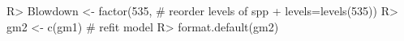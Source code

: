 \documentclass[
]{article}
\begin{document}
\begin{Schunk}
\begin{Sinput}
R> Blowdown <- factor(535,  # reorder levels of spp
+                            levels=levels(535))
R> gm2 <- c(gm1)   # refit model
R> format.default(gm2)
\end{Sinput}
\begin{Soutput}
                                                                                                                                                                                                                                                                                                                                                                                                                                                                                                                                                                                                                                                                                                                                                                                                                                                                                                                                                                                                                                                                                                                                                                                                                                                                                                                                                                                                                                                                                                                                                                                                                                                                                                                                                                                                                                                                                                                                                                                                                                                                                                                                                                                                                                                                                                                                                                                                                                                                                                                                                                                                                                                                                                                                                                                                                                                                                                                                                                                                                                
\end{Soutput}
\end{Schunk}
\end{document}
